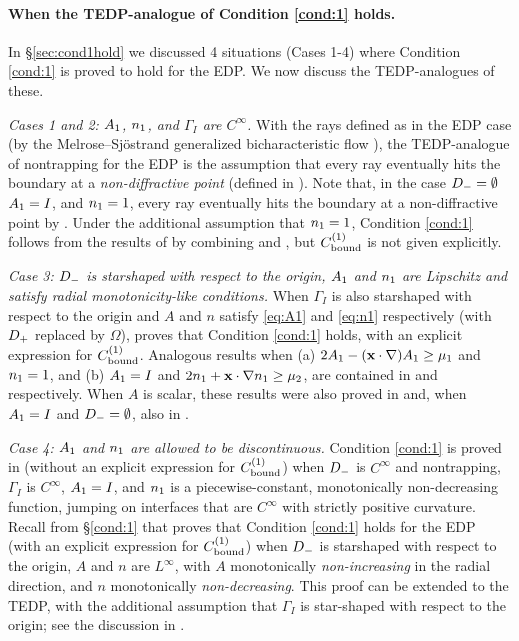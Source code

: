 \paragraph{When the TEDP-analogue of Condition \ref{cond:1} holds.}

In \S\ref{sec:cond1hold} we discussed 4 situations (Cases 1-4) where Condition \ref{cond:1} is proved to hold for the EDP. We now discuss the TEDP-analogues of these.

\emph{Cases 1 and 2: $A_{1}$, $n_{1}$, and $\Gamma_I$  are $C^\infty$.} 
With the rays defined as in the EDP case (by the Melrose--Sj{\"o}strand generalized bicharacteristic flow 
\cite[\S24.3]{Ho:85}), the TEDP-analogue of nontrapping for the EDP is the assumption that 
every ray eventually hits the boundary at a \emph{non-diffractive point} (defined in \cite[Page 1037]{BaLeRa:92}). Note that, in the case $D_{-}=\emptyset$ $A_{1}= I$, and $n_{1}=1$, every ray eventually hits the boundary at a non-diffractive point by \cite[Lemma 5.3]{BaSpWu:16}.
Under the additional assumption that $n_{1}= 1$, Condition \ref{cond:1} follows from the results of \cite{BaLeRa:92} by combining \cite[Theorem 1.8]{BaSpWu:16} and \cite[Remark 5.6]{BaSpWu:16}, but $C^{(1)}_{\rm bound}$ is not given explicitly.

\emph{Case 3: $D_{-}$ is starshaped with respect to the origin, $A_{1}$ and $n_{1}$ are Lipschitz and satisfy radial monotonicity-like conditions.}
When $\Gamma_I$ is also starshaped with respect to the origin and $A$ and $n$ satisfy \eqref{eq:A1} and \eqref{eq:n1} respectively (with $D_{+}$ replaced by $\Omega$), 
\cite[Theorem A.6(i)]{GrPeSp:19} proves that
Condition \ref{cond:1} holds, with an explicit expression for $C^{(1)}_{\rm bound}$. Analogous results when (a) $2A_{1} - (\mathbf{x}\cdot\nabla)A_{1} \geq \mu_1$ and $n_{1}= 1$,
and  (b) $A_{1}= I$ and  $2n_{1} + \mathbf{x} \cdot \nabla n_{1} \geq \mu_2$, 
are contained in \cite[Theorem A.6(ii)]{GrPeSp:19} and \cite[Theorem A.6(iii)]{GrPeSp:19} respectively.
When $A$ is scalar, these results were also proved in \cite[Theorem 1]{BrGaPe:17} and, when $A_{1}= I$ and $D_{-}=\emptyset$, also in \cite[Theorem 3.2]{GrSa:18}.

\emph{Case 4: %
 $A_{1}$ and $n_{1}$ are allowed to be discontinuous.}
Condition \ref{cond:1} is proved in \cite{CaVo:10} (without an explicit expression for $C^{(1)}_{\rm bound}$) when $D_{-}$ is $C^\infty$ and nontrapping, $\Gamma_I$ is $C^\infty$, $A_{1}= I $, and $n_{1}$ is a piecewise-constant, monotonically non-decreasing function, jumping on interfaces that are $C^\infty$ with strictly positive curvature.
Recall from \S\ref{cond:1} that \cite[Theorem 2.7]{GrPeSp:19} proves that Condition \ref{cond:1} holds for the EDP (with an explicit expression for $C^{(1)}_{\rm bound}$) when $D_{-}$ is starshaped with respect to the origin, $A$ and $n$ are $L^\infty$, with $A$ monotonically \emph{non-increasing} in the radial direction, and $n$ monotonically \emph{non-decreasing}. This proof can be extended to the TEDP, with the additional assumption that $\Gamma_I$ is star-shaped with respect to the origin; see the discussion in \cite[Section A.2]{GrPeSp:19}.

